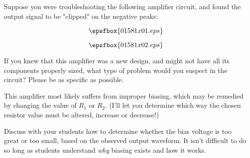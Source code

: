 

Suppose you were troubleshooting the following amplifier circuit, and found the output signal to be "clipped" on the negative peaks:

$$\epsfbox{01581x01.eps}$$

$$\epsfbox{01581x02.eps}$$

If you knew that this amplifier was a new design, and might not have all its components properly sized, what type of problem would you suspect in the circuit?  Please be as specific as possible.







This amplifier most likely suffers from improper biasing, which may be remedied by changing the value of $R_1$ or $R_2$.  (I'll let you determine which way the chosen resistor value must be altered, increase or decrease!)







Discuss with your students how to determine whether the bias voltage is too great or too small, based on the observed output waveform.  It isn't difficult to do so long as students understand {\it why} biasing exists and how it works.




